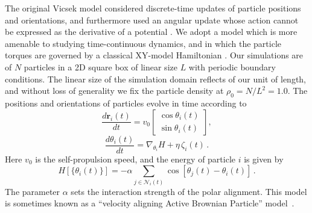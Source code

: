 \documentclass[twoside,twocolumn,9pt]{article}
\begin{document}
The original Vicsek model considered discrete-time updates of particle positions and orientations, and furthermore used an angular update whose action cannot be expressed as the derivative of a potential \cite{chepizhko2021revisiting}.
We adopt a model which is more amenable to studying time-continuous dynamics, and 
in which the particle torques are governed by a classical XY-model Hamiltonian \cite{martin2018collective}.
Our simulations are of $N$ particles in a 2D square box of linear size $L$ with periodic boundary conditions.
The linear size of the simulation domain reflects of our unit of length, and without loss of generality we fix the particle density at $\rho_{0}=N/L^2=1.0$.
The positions and orientations of particles evolve in time according to
\begin{equation}
\label{eq::microscopic_pos_update}
\frac{d\mathbf{r}_{i}(t)}{dt} = v_{0}\begin{bmatrix}
\cos\theta_{i}(t) \\ \sin\theta_{i}(t)
\end{bmatrix},
\end{equation}
\begin{equation}
\label{eq::microscopic_theta_update}
\frac{d\theta_{i}(t)}{dt} = \nabla_{\theta_{i}}H + \eta\,\zeta_{i}(t)\,.
\end{equation}
Here $v_{0}$ is the self-propulsion speed, and the energy of particle $i$ is given by
\begin{equation}
\label{eq::microscopic_Hamiltonian}
H[\{\theta_{i}(t)\}]=-\alpha\sum_{{j}\in\mathcal{N}_i(t)}\cos\left[\theta_{j}(t)-\theta_{i}(t)\right]\,.
\end{equation}
The parameter $\alpha$ sets the interaction strength of the polar alignment. 
This model is sometimes known as a ``velocity aligning Active Brownian Particle'' model~\cite{grossmann2012active}.
\end{document}
